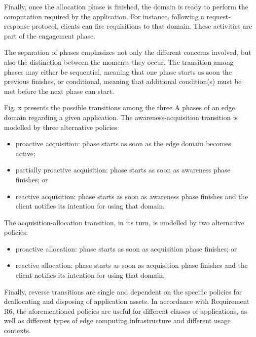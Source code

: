 Finally, once the allocation phase is finished, the domain is ready to perform the computation required by the application. For instance, following a request-response protocol, clients can fire requisitions to that domain. These activities are part of the engagement phase.

The separation of phases emphasizes not only the different concerns involved, but also the distinction between the moments they occur. The transition among phases may either be sequential, meaning that one phase starts as soon the previous finishes, or conditional, meaning that additional condition(s) must be met before the next phase can start. 	

Fig. x presents the possible transitions among the three A phases of an edge domain regarding a given application. The awareness-acquisition transition is modelled by three alternative policies: 

\begin{itemize}

\item proactive acquisition: phase starts as soon as the edge domain becomes active; 

\item partially proactive acquisition: phase starts as soon as awareness phase finishes; or

\item reactive acquisition: phase starts as soon as awareness phase finishes and the client notifies its intention for using that domain.

\end{itemize}

The acquisition-allocation transition, in its turn, is modelled by two alternative policies: 

\begin{itemize}

\item proactive allocation: phase starts as soon as acquisition phase finishes; or

\item reactive allocation: phase starts as soon as acquisition phase finishes and the client notifies its intention for using that domain.

\end{itemize}

Finally, reverse transitions are single and dependent on the specific policies for deallocating and disposing of application assets. 
In accordance with Requirement R6, the aforementioned policies are useful for different classes of applications, as well as different types of edge computing infrastructure and different usage contexts.


